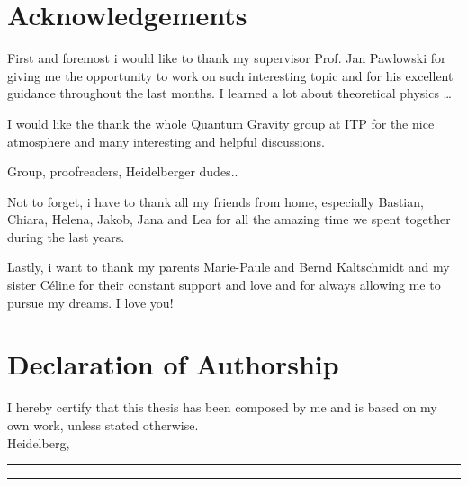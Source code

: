 \thispagestyle{plain}
\section*{Acknowledgements}
First and foremost i would like to thank my supervisor Prof. Jan Pawlowski for giving me the opportunity to work on such interesting topic and for his excellent guidance throughout the last months. I learned a lot about theoretical physics \dots

I would like the thank the whole Quantum Gravity group at ITP for the nice atmosphere and many interesting and  helpful discussions. 

Group, proofreaders, Heidelberger dudes..


Not to forget, i have to thank all my friends from home, especially Bastian, Chiara, Helena, Jakob, Jana and Lea for all the amazing time we spent together during the last years. 

Lastly, i want to thank my parents Marie-Paule and Bernd Kaltschmidt and my sister C\'{e}line for their constant support and love and for always allowing me to pursue my dreams. I love you!  
 

\section*{Declaration of Authorship}
I hereby certify that this thesis has been composed by me and is based on my own work, unless stated otherwise.\\

Heidelberg, \rule{30mm}{.15mm} \hfill \rule{50mm}{.15mm} \par


